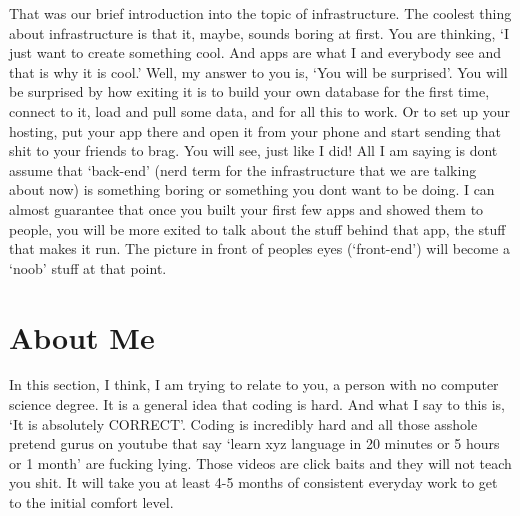 \documentclass[]{book}
\begin{document}
That was our brief introduction into the topic of infrastructure. The coolest thing about infrastructure is that it, maybe, sounds boring at first. You are thinking, `I just want to create something cool. And apps are what I and everybody see and that is why it is cool.' Well, my answer to you is, `You will be surprised'. You will be surprised by how exiting it is to build your own database for the first time, connect to it, load and pull some data, and for all this to work. Or to set up your hosting, put your app there and open it from your phone and start sending that shit to your friends to brag. You will see, just like I did! All I am saying is dont assume that `back-end' (nerd term for the infrastructure that we are talking about now) is something boring or something you dont want to be doing. I can almost guarantee that once you built your first few apps and showed them to people, you will be more exited to talk about the stuff behind that app, the stuff that makes it run. The picture in front of peoples eyes (`front-end') will become a `noob' stuff at that point.

\hypertarget{about-me}{%
\section{About Me}\label{about-me}}

In this section, I think, I am trying to relate to you, a person with no computer science degree. It is a general idea that coding is hard. And what I say to this is, `It is absolutely CORRECT'. Coding is incredibly hard and all those asshole pretend gurus on youtube that say `learn xyz language in 20 minutes or 5 hours or 1 month' are fucking lying. Those videos are click baits and they will not teach you shit. It will take you at least 4-5 months of consistent everyday work to get to the initial comfort level.
\end{document}
